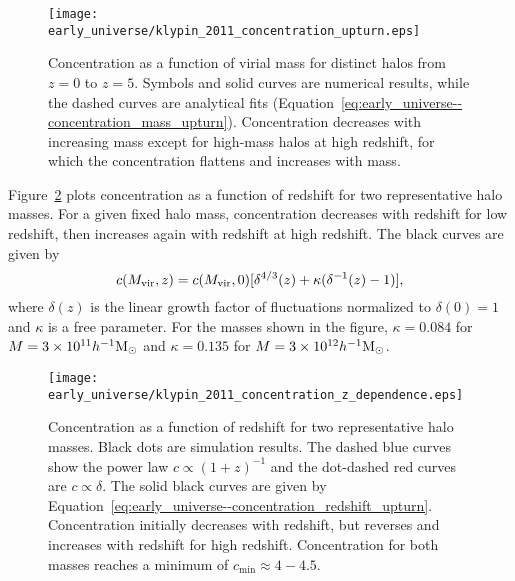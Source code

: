 \begin{figure}[tp]
	\centering
	\texttt{[image: early\_universe/klypin\_2011\_concentration\_upturn.eps]}
	\caption[Concentration upturn for high mass halos at high $z$]{\footnotesize Concentration as a function of virial mass for distinct halos from $z = 0$ to $z = 5$.  Symbols and solid curves are numerical results, while the dashed curves are analytical fits (Equation~\ref{eq:early_universe--concentration_mass_upturn}).  Concentration decreases with increasing mass except for high-mass halos at high redshift, for which the concentration flattens and increases with mass.  \citep{2011ApJ...740..102K}}
	\label{fig:concentration--klypin_concentration_upturn}
\end{figure}

Figure~\ref{fig:concentration--klypin_concentration_z_dependence} plots concentration as a function of redshift for two representative halo masses.  For a given fixed halo mass, concentration decreases with redshift for low redshift, then increases again with redshift at high redshift.  The black curves are given by
\begin{equation} \label{eq:early_universe--concentration_redshift_upturn}
	c({M_{\mathrm{vir}}}, z) = c({M_{\mathrm{vir}}}, 0) [\delta^{4/3}(z) + \kappa(\delta^{-1}(z) - 1)],
\end{equation}
where $\delta(z)$ is the linear growth factor of fluctuations normalized to $\delta(0) = 1$ and $\kappa$ is a free parameter.  For the masses shown in the figure, $\kappa = 0.084$ for $M = 3 \times 10^{11} h^{-1} {\rm M_\odot}$ and $\kappa = 0.135$ for $M = 3 \times 10^{12} h^{-1} {\rm M_\odot}$.

\begin{figure}[tp]
	\centering
	\texttt{[image: early\_universe/klypin\_2011\_concentration\_z\_dependence.eps]}
	\caption[Evolution of concentration with redshift for two halo masses]{\footnotesize Concentration as a function of redshift for two representative halo masses.  Black dots are simulation results.  The dashed blue curves show the power law $c \propto (1 + z)^{-1}$ and the dot-dashed red curves are $c \propto \delta$.  The solid black curves are given by Equation~\ref{eq:early_universe--concentration_redshift_upturn}.  Concentration initially decreases with redshift, but reverses and increases with redshift for high redshift.  Concentration for both masses reaches a minimum of $c_{\min} \approx 4-4.5$. \citep{2011ApJ...740..102K}}
	\label{fig:concentration--klypin_concentration_z_dependence}
\end{figure}

